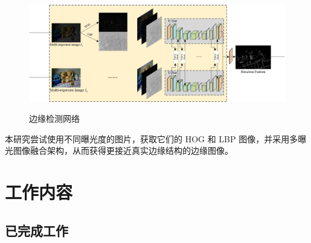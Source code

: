 \documentclass[CJK,aspectratio=169]{beamer}  %
\begin{document}
	\begin{frame}
		\begin{figure}
			\centering
			\setlength{\abovecaptionskip}{-0.05cm} 	
			\begin{minipage}{0.9\textwidth}
				\centering
				\includegraphics[width=\linewidth]{picture/LLIE/My Architecture/Edge Detection Network}
				\captionsetup{font=scriptsize}
				\label{fig: Edge Detection Network}	
				\caption{\tiny 边缘检测网络}
			\end{minipage}
		\end{figure}
		
		\vspace{-0.5cm}
		
		{ \yahei 本研究尝试使用不同曝光度的图片，获取它们的 HOG 和 LBP 图像，并采用多曝光图像融合架构，从而获得更接近真实边缘结构的边缘图像。}
	\end{frame}
	
	\section{工作内容}
	
	\subsection{已完成工作}
	
%		
%		
%		
	
\end{document}
